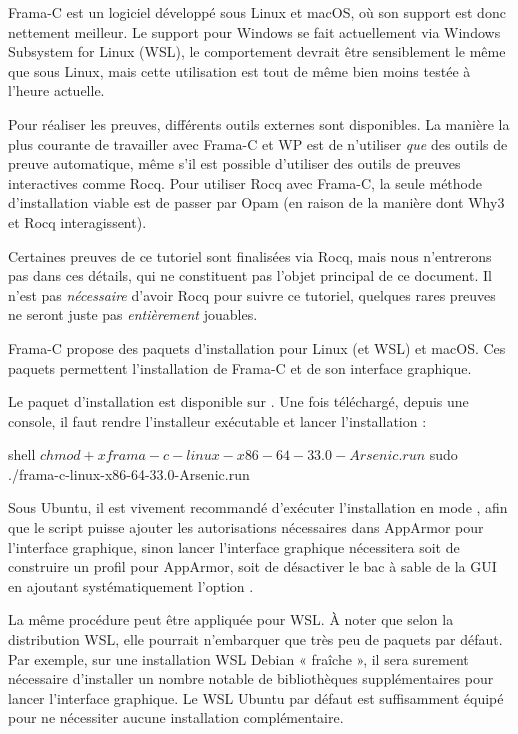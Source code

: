 

Frama-C est un logiciel développé sous Linux et macOS, où son support est donc
nettement meilleur. Le support pour Windows se fait actuellement via
Windows Subsystem for Linux (WSL), le comportement devrait être sensiblement le
même que sous Linux, mais cette utilisation est tout de même bien moins testée
à l'heure actuelle.


Pour réaliser les preuves, différents outils externes sont disponibles.
La manière la plus courante de travailler avec Frama-C et WP est de
n'utiliser \textit{que} des outils de preuve automatique, même s'il est possible
d'utiliser des outils de preuves interactives comme Rocq. Pour utiliser Rocq
avec Frama-C, la seule méthode d'installation viable est de passer par Opam
(en raison de la manière dont Why3 et Rocq interagissent).


Certaines preuves de ce tutoriel sont finalisées via Rocq, mais nous n’entrerons
pas dans ces détails, qui ne constituent pas l’objet principal de ce document.
Il n'est pas \textit{nécessaire} d'avoir Rocq pour suivre ce tutoriel, quelques
rares preuves ne seront juste pas \textit{entièrement} jouables.




Frama-C propose des paquets d'installation pour Linux (et WSL) et macOS. Ces
paquets permettent l'installation de Frama-C et de son interface graphique.




Le paquet d'installation est disponible sur
.
Une fois téléchargé, depuis une console, il faut rendre l'installeur exécutable
et lancer l'installation :
\begin{CodeBlock}{shell}
$ chmod +x frama-c-linux-x86-64-33.0-Arsenic.run
$ sudo ./frama-c-linux-x86-64-33.0-Arsenic.run
\end{CodeBlock}


Sous Ubuntu, il est vivement recommandé d'exécuter l'installation en mode
, afin que le script puisse ajouter les autorisations
nécessaires dans AppArmor pour l'interface graphique, sinon lancer l'interface
graphique nécessitera soit de construire un profil pour AppArmor, soit de
désactiver le bac à sable de la GUI en ajoutant systématiquement l'option
.


La même procédure peut être appliquée pour WSL. À noter que selon la distribution
WSL, elle pourrait n'embarquer que très peu de paquets par défaut. Par exemple,
sur une installation WSL Debian « fraîche », il sera surement nécessaire
d'installer un nombre notable de bibliothèques supplémentaires pour lancer
l'interface graphique. Le WSL Ubuntu par défaut est suffisamment équipé pour ne
nécessiter aucune installation complémentaire.


